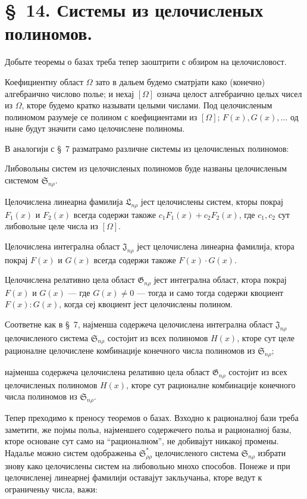 ﻿\documentclass[11pt]{article}
\providecommand{\Ssys}{\mathfrak{S}}
\providecommand{\Jdom}{\mathfrak{J}}
\providecommand{\Gdom}{\mathfrak{G}}
\providecommand{\Lsys}{\mathfrak{L}}
\begin{document}
\section*{\S\ 14. Системы из целочисленых полиномов.}

Добыте теоремы о базах треба тепер заоштрити с обзиром на целочисловост.

Коефициентну област $\Omega$ зато в дальем будемо сматрјати како (конечно) алгебраично числово полье; и нехај $[\Omega]$ означа целост алгебраично целых чисел из $\Omega$, кторе будемо кратко называти целыми числами. Под целочисленым полиномом разумеје се полином с коефициентами из $[\Omega]$; $F(x),G(x),\ldots$ од ныне будут значити само целочислене полиномы.

В аналогији с \S\ 7 разматрамо различне системы из целочисленых полиномов:

Либовольны систем из целочисленых полиномов буде названы целочисленым системом $\Ssys_{n\rho}$.

Целочислена линеарна фамилија $\Lsys_{n\rho}$ јест целочислены систем, кторы покрај $F_1(x)$ и $F_2(x)$ всегда содержи такоже $c_1F_1(x)+c_2F_2(x)$, где $c_1,c_2$ сут либовольне целе числа из $[\Omega]$.

Целочислена интегрална област $\Jdom_{n\rho}$ јест целочислена линеарна фамилија, ктора покрај $F(x)$ и $G(x)$ всегда содержи такоже $F(x)\cdot G(x)$.

Целочислена релативно цела област $\Gdom_{n\rho}$ јест интегрална област, ктора покрај $F(x)$ и $G(x)$ --- где $G(x)\ne0$ --- тогда и само тогда содержи квоциент $F(x):G(x)$, когда сеј квоциент јест целочислены полином.

Соответне как в \S\ 7, најменша содержеча целочислена интегрална област $\Jdom_{n\rho}$ целочисленого система $\Ssys_{n\rho}$ состојит из всех полиномов $H(x)$, кторе сут целе рационалне целочислене комбинације конечного числа полиномов из $\Ssys_{n\rho}$;

најменша содержеча целочислена релативно цела област $\Gdom_{n\rho}$ состојит из всех целочисленых полиномов $H(x)$, кторе сут рационалне комбинације конечного числа полиномов из $\Ssys_{n\rho}$.

Тепер преходимо к преносу теоремов о базах. Взходно к рационалној бази треба заметити, же појмы польа, најменшего содержечего польа и рационалној базы, кторе основане сут само на ``рационалном'', не добивајут никакој промены. Надалье можно систем одображеньа $\Ssys^*_{\rho\rho}$ целочисленого система $\Ssys_{n\rho}$ избрати знову како целочислены систем на либовольно мнохо способов. Понеже и при целочисленеј линеарнеј фамилији оставајут закльучаньа, кторе ведут к ограниченьу числа, важи:
\end{document}

